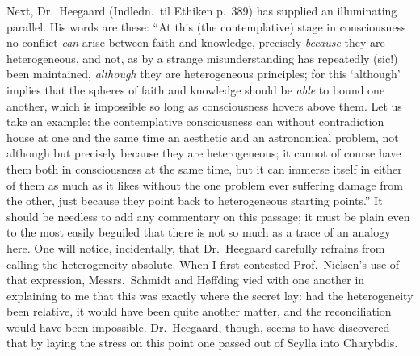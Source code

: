 \documentclass[12pt,a4paper]{book}
\newcommand{\opage}[1]{\marginnote{\footnotesize\textit{[#1]}}}
\begin{document}
Next, Dr.\ Heegaard (Indledn.\ til Ethiken p.\ 389) has supplied an
illuminating parallel. His words are these: ``At this (the contemplative) stage
in consciousness no conflict \emph{can} arise between faith and knowledge,
precisely \emph{because} they are heterogeneous, and not, as by a strange
misunderstanding has repeatedly (sic!) been maintained, \emph{although} they
are heterogeneous
\opage{39}principles; for this `although' implies that the spheres
of faith and knowledge should be \emph{able} to bound one another, which is
impossible so long as consciousness hovers above them. Let us take an example:
the contemplative consciousness can without contradiction house at one and the
same time an aesthetic and an astronomical problem, not although but precisely
because they are heterogeneous; it cannot of course have them both in
consciousness at the same time, but it can immerse itself in either of them as
much as it likes without the one problem ever suffering damage from the other,
just because they point back to heterogeneous starting points.'' It should be
needless to add any commentary on this passage; it must be plain even to the
most easily beguiled that there is not so much as a trace of an analogy here.
One will notice, incidentally, that Dr.\ Heegaard carefully refrains from
calling the heterogeneity absolute. When I first contested Prof.\ Nielsen's use
of that expression, Messrs.\ Schmidt and Høffding vied with one another in
explaining to me that this was exactly where the secret lay: had the
heterogeneity been relative, it would have been quite another matter, and the
reconciliation would have been impossible. Dr.\ Heegaard, though, seems to have
discovered that by laying the stress on this point one passed out of Scylla
into Charybdis.
\end{document}
